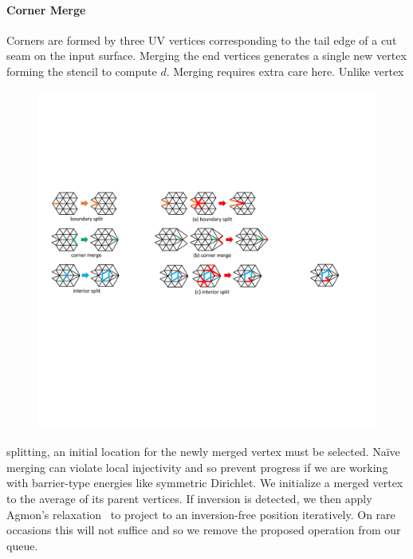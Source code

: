 \paragraph{Corner Merge}
Corners are formed by three UV vertices corresponding to the tail edge of a cut seam on the input surface. 
%
Merging the end vertices generates a single new vertex forming the stencil to compute $d$. Merging requires extra care here. Unlike vertex 
%
\begin{figure}
  \begin{center}
  \vspace{-5mm}
    \includegraphics[width=1\linewidth]{fig/cMerge}
  \vspace{-4mm}
  \end{center}
\end{figure}
%
splitting, an initial location for the newly merged vertex must be selected. Na\"ive merging can violate local injectivity and so prevent progress if we are working with barrier-type energies like symmetric Dirichlet. We initialize a merged vertex to the average of its parent vertices. If inversion is detected, we then apply Agmon's relaxation~ to project to an inversion-free position iteratively. On rare occasions this will not suffice and so we remove the proposed operation from our queue.

